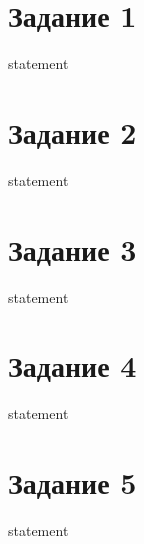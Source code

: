 \section{Задание 1}

{statement}

\section{Задание 2}
{statement}

\section{Задание 3}

{statement}

\section{Задание 4}

{statement}

\section{Задание 5}

{statement}